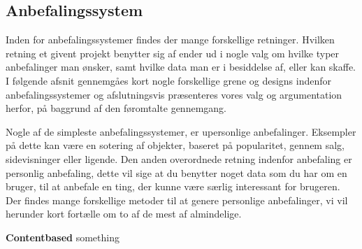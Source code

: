 \subsection{Anbefalingssystem}
Inden for anbefalingssystemer findes der mange forskellige retninger.
Hvilken retning et givent projekt benytter sig af ender ud i nogle valg om hvilke typer anbefalinger man ønsker, samt hvilke data man er i besiddelse af, eller kan skaffe.
I følgende afsnit gennemgåes kort nogle forskellige grene og designs indenfor anbefalingssystemer og afslutningsvis præsenteres vores valg og argumentation herfor, på baggrund af den føromtalte gennemgang.

Nogle af de simpleste anbefalingssystemer, er upersonlige anbefalinger.
Eksempler på dette kan være en sotering af objekter, baseret på popularitet, gennem salg, sidevisninger eller ligende.
Den anden overordnede retning indenfor anbefaling er personlig anbefaling, dette vil sige at du benytter noget data som du har om en bruger, til at anbefale en ting, der kunne være særlig interessant for brugeren.
Der findes mange forskellige metoder til at genere personlige anbefalinger, vi vil herunder kort fortælle om to af de mest af almindelige.

\textbf{Contentbased}
something


